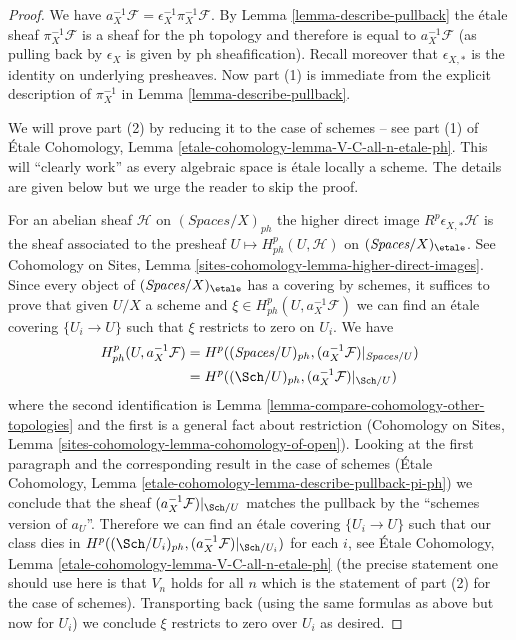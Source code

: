 \begin{proof}
We have $a_X^{-1}\mathcal{F} = \epsilon_X^{-1} \pi_X^{-1}\mathcal{F}$.
By Lemma \ref{lemma-describe-pullback} the \'etale sheaf
$\pi_X^{-1}\mathcal{F}$ is a sheaf for the ph topology
and therefore is equal to $a_X^{-1}\mathcal{F}$ (as pulling
back by $\epsilon_X$ is given by ph sheafification).
Recall moreover that $\epsilon_{X, *}$ is the identity
on underlying presheaves.
Now part (1) is immediate from the explicit description of $\pi_X^{-1}$
in Lemma \ref{lemma-describe-pullback}.

\medskip\noindent
We will prove part (2) by reducing it to the case of schemes --
see part (1) of
\'Etale Cohomology, Lemma \ref{etale-cohomology-lemma-V-C-all-n-etale-ph}.
This will ``clearly work'' as every algebraic space is
\'etale locally a scheme. The details are given below but we urge
the reader to skip the proof.

\medskip\noindent
For an abelian sheaf $\mathcal{H}$ on $(\textit{Spaces}/X)_{ph}$ the
higher direct image $R^p\epsilon_{X, *}\mathcal{H}$ is the sheaf
associated to the presheaf $U \mapsto H^p_{ph}(U, \mathcal{H})$
on $(\textit{Spaces}/X)_\etale$. See
Cohomology on Sites, Lemma \ref{sites-cohomology-lemma-higher-direct-images}.
Since every object of $(\textit{Spaces}/X)_\etale$ has a covering
by schemes, it suffices to prove that given $U/X$ a scheme and
$\xi \in H^p_{ph}(U, a_X^{-1}\mathcal{F})$ we can find
an \'etale covering $\{U_i \to U\}$ such that $\xi$
restricts to zero on $U_i$. We have
\begin{align*}
H^p_{ph}(U, a_X^{-1}\mathcal{F})
& =
H^p((\textit{Spaces}/U)_{ph}, (a_X^{-1}\mathcal{F})|_{\textit{Spaces}/U}) \\
& =
H^p((\Sch/U)_{ph}, (a_X^{-1}\mathcal{F})|_{\Sch/U})
\end{align*}
where the second identification is
Lemma \ref{lemma-compare-cohomology-other-topologies}
and the first is a general fact about restriction
(Cohomology on Sites, Lemma \ref{sites-cohomology-lemma-cohomology-of-open}).
Looking at the first paragraph and the corresponding result in the
case of schemes (\'Etale Cohomology, Lemma
\ref{etale-cohomology-lemma-describe-pullback-pi-ph})
we conclude that the sheaf $(a_X^{-1}\mathcal{F})|_{\Sch/U}$
matches the pullback by the ``schemes version of $a_U$''.
Therefore we can find an \'etale covering
$\{U_i \to U\}$ such that our class dies in
$H^p((\Sch/U_i)_{ph}, (a_X^{-1}\mathcal{F})|_{\Sch/U_i})$
for each $i$, see
\'Etale Cohomology, Lemma \ref{etale-cohomology-lemma-V-C-all-n-etale-ph}
(the precise statement one should use here is that $V_n$ holds for all $n$
which is the statement of part (2) for the case of schemes).
Transporting back (using the same formulas as above but now for
$U_i$) we conclude $\xi$ restricts to zero over $U_i$ as desired.
\end{proof}

